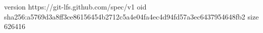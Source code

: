 version https://git-lfs.github.com/spec/v1
oid sha256:a5769d3a8ff3ce86156454b2712c5a4e04fa4ec4d94fd57a3ec6437954648fb2
size 626416
